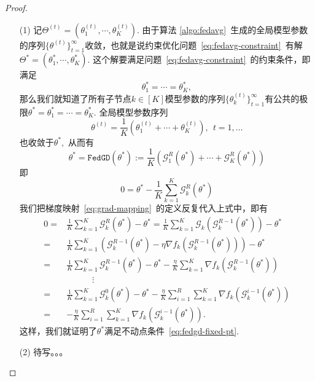 \begin{proof}
\begin{itemize}
\item[(1)] 记$\Theta^{(t)} = (\theta_1^{(t)}, \cdots, \theta_K^{(t)}).$ 由于算法 \ref{algo:fedavg}~生成的全局模型参数的序列$\{ \theta^{(t)} \}_{t=1}^{\infty}$收敛，也就是说约束优化问题~\eqref{eq:fedavg-constraint}~有解$\Theta^* = (\theta_1^*, \cdots, \theta_K^*).$ 这个解要满足问题~\eqref{eq:fedavg-constraint}~的约束条件，即满足
\begin{equation*}
\theta_1^* = \cdots = \theta_K^*,
\end{equation*}
那么我们就知道了所有子节点$k \in [K]$模型参数的序列$\{ \theta_k^{(t)} \}_{t=1}^{\infty}$有公共的极限$\theta^* = \theta_1^* = \cdots = \theta_K^*.$ 全局模型参数序列
\begin{equation*}
\theta^{(t)} = \frac{1}{K} (\theta_1^{(t)} + \cdots + \theta_K^{(t)}), ~~ t = 1, \ldots
\end{equation*}
也收敛于$\theta^*,$ 从而有
\begin{equation*}
\theta^* = \texttt{FedGD} (\theta^*) := \frac{1}{K} ( \mathcal{G}^R_1 (\theta^*) + \cdots + \mathcal{G}^R_K (\theta^*) )
\end{equation*}
即
\begin{equation*}
0 = \theta^* - \frac{1}{K} \sum\limits_{k=1}^K \mathcal{G}^R_k (\theta^*)
\end{equation*}
我们把梯度映射~\eqref{eq:grad-mapping}~的定义反复代入上式中，即有
\begin{align*}
0 = & \frac{1}{K}\sum_{k=1}^K \mathcal{G}^R_k(\theta^{*}) - \theta^{*} = \frac{1}{K} \sum_{k=1}^K \mathcal{G}_k ( \mathcal{G}^{R-1}_k (\theta^{*}) ) - \theta^{*} \\
= & \frac{1}{K}\sum_{k=1}^K \left( \mathcal{G}^{R-1}_k(\theta^{*}) - \eta\nabla f_k (\mathcal{G}^{R-1}_k(\theta^{*})) \right) - \theta^{*} \\
= & \frac{1}{K}\sum_{k=1}^K \mathcal{G}^{R-1}_k(\theta^{*}) - \theta^{*} - \frac{\eta}{K} \sum_{k=1}^K \nabla f_k (\mathcal{G}^{R-1}_k(\theta^{*})) \\
& \hspace{3em} \vdots \\
= & \frac{1}{K}\sum_{k=1}^K \mathcal{G}^{0}_k(\theta^{*}) - \theta^{*} - \frac{\eta}{K} \sum\limits_{i=1}^R \sum\limits_{k=1}^K \nabla f_k( \mathcal{G}_k^{i-1}(\theta^*) ) \\
= & - \frac{\eta}{K} \sum\limits_{i=1}^R \sum\limits_{k=1}^K \nabla f_k( \mathcal{G}_k^{i-1}(\theta^*) ).
\end{align*}
这样，我们就证明了$\theta^*$满足不动点条件~\eqref{eq:fedgd-fixed-pt}.
\item[(2)] 待写。。。
\end{itemize}
\end{proof}

